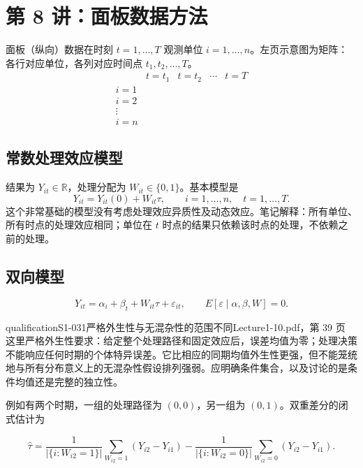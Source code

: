 \section{第 8 讲：面板数据方法}
面板（纵向）数据在时刻 $t=1,\ldots,T$ 观测单位 $i=1,\ldots,n$。左页示意图为矩阵：各行对应单位，各列对应时间点 $t_1,t_2,\ldots,T$。
\[
\begin{array}{c|cccc}
 &t=t_1&t=t_2&\cdots&t=T\\\hline
 i=1&&&&\\i=2&&&&\\\vdots&&&&\\i=n&&&&
\end{array}
\]

\subsection{常数处理效应模型}
结果为 $Y_{it}\in\mathbb R$，处理分配为 $W_{it}\in\{0,1\}$。基本模型是
\[
Y_{it}=Y_{it}(0)+W_{it}\tau,\qquad i=1,\ldots,n,\quad t=1,\ldots,T.
\tag{原笔记 8.1}
\]
这个非常基础的模型没有考虑处理效应异质性及动态效应。笔记解释：所有单位、所有时点的处理效应相同；单位在 $t$ 时点的结果只依赖该时点的处理，不依赖之前的处理。
\subsection{双向模型}
\[
Y_{it}=\alpha_i+\beta_t+W_{it}\tau+\varepsilon_{it},
\qquad E[\varepsilon\mid\alpha,\beta,W]=0.
\tag{原笔记 8.2}
\]
\begin{reviewnote}{qualification}{S1-031}{严格外生性与无混杂性的范围不同}{Lecture1-10.pdf，第 39 页}
这里严格外生性要求：给定整个处理路径和固定效应后，误差均值为零；处理决策不能响应任何时期的个体特异误差。它比相应的同期均值外生性更强，但不能笼统地与所有分布意义上的无混杂性假设排列强弱。应明确条件集合，以及讨论的是条件均值还是完整的独立性。
\end{reviewnote}
例如有两个时期，一组的处理路径为 $(0,0)$，另一组为 $(0,1)$。双重差分的闭式估计为

\[
\widehat\tau=\frac1{|\{i:W_{i2}=1\}|}\sum_{W_{i2}=1}(Y_{i2}-Y_{i1})
-\frac1{|\{i:W_{i2}=0\}|}\sum_{W_{i2}=0}(Y_{i2}-Y_{i1}).
\]
